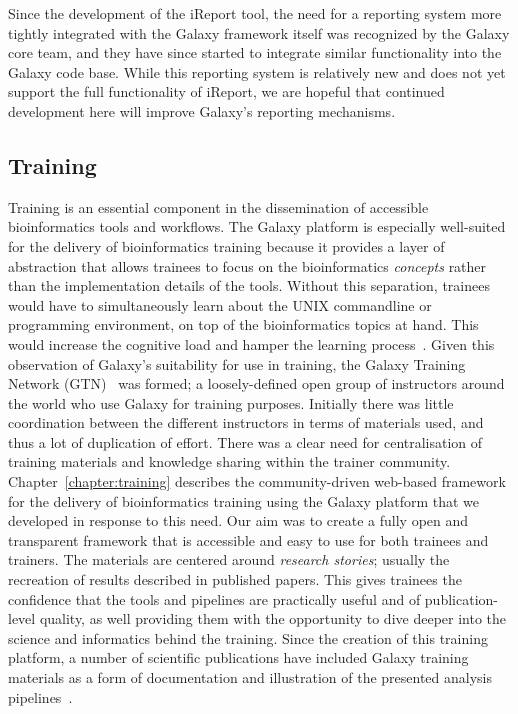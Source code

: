 Since the development of the iReport tool, the need for a reporting system more tightly integrated with the Galaxy framework itself was recognized by the Galaxy core team, and they have since started to integrate similar functionality into the Galaxy code base. While this reporting system is relatively new and does not yet support the full functionality of iReport, we are hopeful that continued development here will improve Galaxy's reporting mechanisms.

\subsection{Training}
Training is an essential component in the dissemination of accessible bioinformatics tools and workflows. The Galaxy platform is especially well-suited for the delivery of bioinformatics training because it provides a layer of abstraction that allows trainees to focus on the bioinformatics \emph{concepts} rather than the implementation details of the tools. Without this separation, trainees would have to simultaneously learn about the UNIX commandline or programming environment, on top of the bioinformatics topics at hand. This would increase the cognitive load and hamper the learning process~\cite{paas2003cognitive}. Given this observation of Galaxy's suitability for use in training, the Galaxy Training Network (GTN)~\cite{url-gtn} was formed; a loosely-defined open group of instructors around the world who use Galaxy for training purposes. Initially there was little coordination between the different instructors in terms of materials used, and thus a lot of duplication of effort. There was a clear need for centralisation of training materials and knowledge sharing within the trainer community. Chapter~\ref{chapter:training} describes the community-driven web-based framework for the delivery of bioinformatics training using the Galaxy platform that we developed in response to this need.
Our aim was to create a fully open and transparent framework that is accessible and easy to use for both trainees and trainers. The materials are centered around \emph{research stories}; usually the recreation of results described in published papers. This gives trainees the confidence that the tools and pipelines are practically useful and of publication-level quality, as well providing them with the opportunity to dive deeper into the science and informatics behind the training. Since the creation of this training platform, a number of scientific publications have included Galaxy training materials as a form of documentation and illustration of the presented analysis pipelines~\cite{gruning2017rna,blank2018disseminating,batut2017asaim,hiltemann2018galaxy}.

